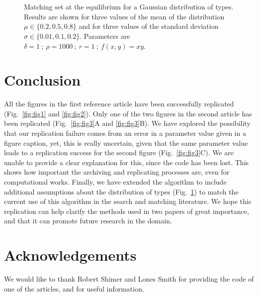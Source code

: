 \begin{figure}[!ht]
   \centering
   \quad
   \quad
   \quad
   \\
   \quad
   \quad
   \quad
   \\
   \quad
   \quad
   \quad
   \caption{Matching set at the equilibrium for a Gaussian distribution of types. Results are shown for three values of the mean of the distribution $\mu \in \{0.2,0.5,0.8\}$ and for three values of the standard deviation $\sigma \in \{0.01,0.1,0.2\}$. Parameters are $\delta=1 \ ; \ \rho=1000 \ ; \ r=1 \ ; \ f(x,y)=xy$.}
   \label{fig:fig4}
\end{figure}




\section*{Conclusion}
All the figures in the first reference article \citep{shimer_assortative_2000} have been successfully replicated (Fig.~\ref{fig:fig1} and \ref{fig:fig2}). Only one of the two figures in the second article \citep{smith_marriage_2006} has been replicated (Fig.~\ref{fig:fig3}A and \ref{fig:fig3}B). We have explored the possibility that our replication failure comes from an error in a parameter value given in a figure caption, yet, this is really uncertain, given that the same parameter value leads to a replication success for the second figure (Fig.~\ref{fig:fig3}C). We are unable to provide a clear explanation for this, since the code has been lost. This shows how important the archiving and replicating processes are, even for computational works. Finally, we have extended the algorithm to include additional assumptions about the distribution of types (Fig.~\ref{fig:fig4}) to match the current use of this algorithm in the search and matching literature. We hope this replication can help clarify the methods used in two papers of great importance, and that it can promote future research in the domain.


\section*{Acknowledgements}
We would like to thank Robert Shimer and Lones Smith for providing the code of one of the articles, and for useful information.
